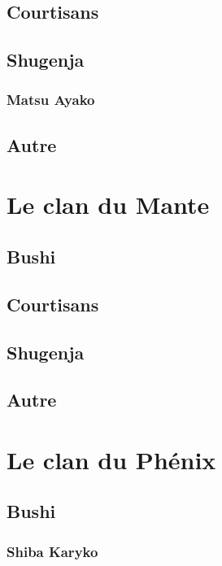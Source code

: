 \documentclass[10pt,a4paper]{book}
\begin{document}
\section{Courtisans}

\section{Shugenja}
\subsection{Matsu Ayako}

\section{Autre}


\chapter{Le clan du Mante}

\section{Bushi}

\section{Courtisans}

\section{Shugenja}

\section{Autre}


\chapter{Le clan du Phénix}

\section{Bushi}

\subsection{Shiba Karyko}
\end{document}
